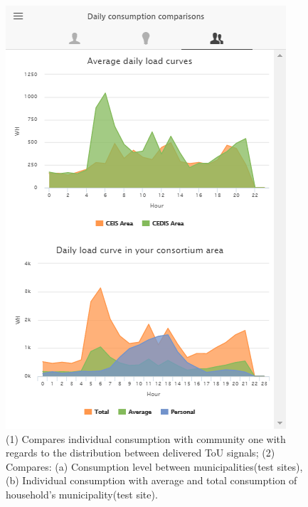 \begin{figure}[htb]
\begin{center}
\begin{minipage}[htb]{0.45\linewidth}
         \includegraphics[width=1\linewidth]{img/benchmark.png}
        \end{minipage}
      \end{center}
      \caption{(1) Compares individual consumption with community one with regards to the distribution between delivered ToU signals; (2) Compares: (a) Consumption level between municipalities(test sites), (b) Individual consumption with average and total consumption of household's municipality(test site).
}
\label{fig:comparison}
\end{figure}

